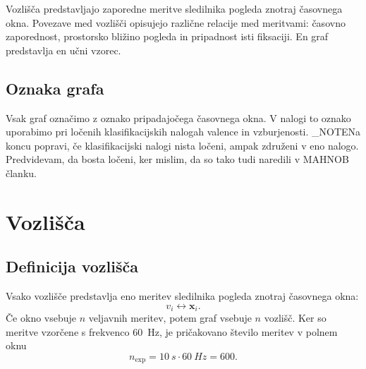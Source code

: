 Vozlišča predstavljajo zaporedne meritve sledilnika pogleda znotraj časovnega okna.
Povezave med vozlišči opisujejo različne relacije med meritvami: časovno zaporednost, prostorsko bližino pogleda in pripadnost isti fiksaciji.
En graf predstavlja en učni vzorec.

\subsection{Oznaka grafa}


Vsak graf označimo z oznako pripadajočega časovnega okna.
V nalogi to oznako uporabimo pri ločenih klasifikacijskih nalogah valence in vzburjenosti.
\END_NOTE{Na koncu popravi, če klasifikacijski nalogi nista ločeni, ampak združeni v eno nalogo. Predvidevam, da bosta ločeni, ker mislim, da so tako tudi naredili v MAHNOB članku.}



\section{Vozlišča}
\label{subsec:vozlisca}

\subsection{Definicija vozlišča}

Vsako vozlišče predstavlja eno meritev sledilnika pogleda znotraj časovnega okna:
\begin{equation}
    v_i \leftrightarrow \mathbf{x}_i.
\end{equation}
Če okno vsebuje $n$ veljavnih meritev, potem graf vsebuje $n$ vozlišč.
Ker so meritve vzorčene s frekvenco 60~Hz, je pričakovano število meritev v polnem oknu
\begin{equation}
    n_{\mathrm{exp}} = 10~s \cdot 60~Hz = 600.
\end{equation}

